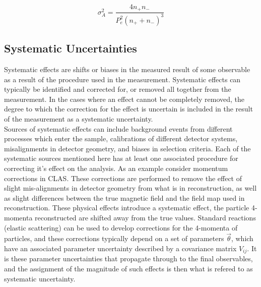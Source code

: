 \begin{equation}
  \sigma_{A}^{2} = \frac{4n_+ n_-}{P_{e}^{2} (n_+ + n_-)^3}
\end{equation}



\subsection*{Systematic Uncertainties}
Systematic effects are shifts or biases in the measured result of some observable as a result of the procedure used in the measurement.  Systematic effects can typically be identified and corrected for, or removed all together from the measurement.  In the cases where an effect cannot be completely removed, the degree to which the correction for the effect is uncertain is included in the result of the measurement as a systematic uncertainty. \\

Sources of systematic effects can include background events from different processes which enter the sample, calibrations of different detector systems, misalignments in detector geometry, and biases in selection criteria.  Each of the systematic sources mentioned here has at least one associated procedure for correcting it's effect on the analysis.  As an example consider momentum corrections in CLAS.  These corrections are performed to remove the effect of slight mis-alignments in detector geometry from what is in reconstruction, as well as slight differences between the true magnetic field and the field map used in reconstruction.  These physical effects introduce a systematic effect, the particle 4-momenta reconstructed are shifted away from the true values.  Standard reactions (elastic scattering) can be used to develop corrections for the 4-momenta of particles, and these corrections typically depend on a set of parameters $\vec{\theta}$, which have an associated parameter uncertainty described by a covariance matrix $V_{ij}$.  It is these parameter uncertainties that propagate through to the final observables, and the assignment of the magnitude of such effects is then what is refered to as systematic uncertainty. \\

